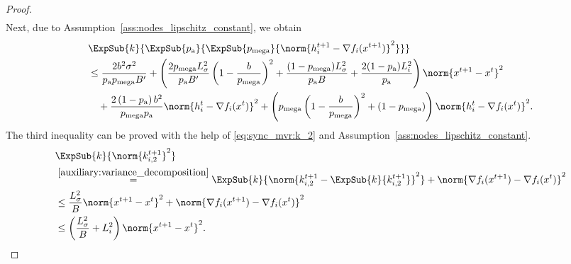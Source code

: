 \documentclass{article}
\newcommand*{\probavailable}{\ensuremath{p_{\textnormal{a}}}}
\newcommand*{\probmega}{\ensuremath{p_{\text{mega}}}}
\begin{document}
\begin{proof}
\begin{align*}
  \end{align*}
  Next, due to Assumption~\ref{ass:nodes_lipschitz_constant}, we obtain
  \begin{align*}
    &\ExpSub{k}{\ExpSub{\probavailable}{\ExpSub{\probmega}{\norm{h^{t+1}_i - \nabla f_i(x^{t+1})}^2}}} \\
    &\leq \frac{2 b^2 \sigma^2}{\probavailable \probmega B'} + \left(\frac{2 \probmega L_{\sigma}^2}{\probavailable B'}\left(1 - \frac{b}{\probmega}\right)^2 + \frac{(1 - \probmega) L_{\sigma}^2}{\probavailable B} + \frac{2(1 - \probavailable) L_{i}^2}{\probavailable}\right) \norm{x^{t+1} - x^{t}}^2 \\
    &\quad + \frac{2\left(1 - \probavailable\right)b^2}{\probmega \probavailable} \norm{h^t_i - \nabla f_i(x^{t})}^2 + \left(\probmega \left(1 - \frac{b}{\probmega}\right)^2 + (1 - \probmega)\right) \norm{h^{t}_i - \nabla f_i(x^{t})}^2.
  \end{align*}
  The third inequality can be proved with the help of \eqref{eq:sync_mvr:k_2} and Assumption~\ref{ass:nodes_lipschitz_constant}.
  \begin{align*}
    &\ExpSub{k}{\norm{k^{t+1}_{i, 2}}^2} \\
    &\overset{\eqref{auxiliary:variance_decomposition}}{=}\ExpSub{k}{\norm{k^{t+1}_{i, 2} - \ExpSub{k}{k^{t+1}_{i, 2}}}^2} + \norm{\nabla f_i(x^{t+1}) - \nabla f_i(x^{t})}^2 \\
    &\leq \frac{L_{\sigma}^2}{B} \norm{x^{t+1} - x^{t}}^2 + \norm{\nabla f_i(x^{t+1}) - \nabla f_i(x^{t})}^2 \\
    &\leq \left(\frac{L_{\sigma}^2}{B} + L_{i}^2\right) \norm{x^{t+1} - x^{t}}^2.
  \end{align*}
\end{proof}

\CONVERGENCESYNCMVR*
\end{document}
